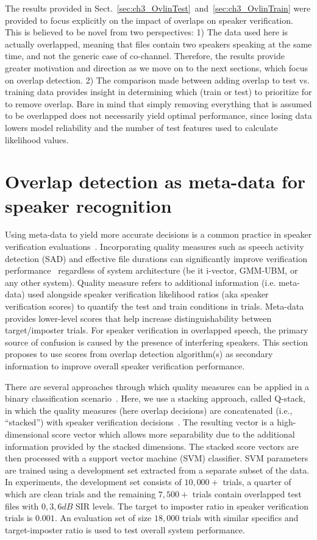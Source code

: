 The results provided in Sect.~\ref{sec:ch3_OvlinTest}~and~\ref{sec:ch3_OvlinTrain} were provided to focus explicitly on the impact of overlaps on speaker verification. 
This is believed to be novel from two perspectives: 
1) The data used here is actually overlapped, meaning that files contain two speakers speaking at the same time, and not the generic case of co-channel. Therefore, the results provide greater motivation and direction as we move on to the next sections, which focus on overlap detection. 
2) The comparison made between adding overlap to test vs. training data provides insight in determining which (train or test) to prioritize for to remove overlap. Bare in mind that simply removing everything that is assumed to be overlapped does not necessarily yield optimal performance, since losing data lowers model reliability and the number of test features used to calculate likelihood values. 


\section{Overlap detection as meta-data for speaker recognition}
\label{sec:ch2_OvlQualityMeasure} 
Using meta-data to yield more accurate decisions is a common practice in speaker verification evaluations~\cite{bosaris,qual_sid_13}. 
Incorporating quality measures such as speech activity detection (SAD) and effective file durations can significantly improve verification performance~\cite{qual_sid_13,CRSSSRE12} regardless of system architecture (be it i-vector, GMM-UBM, or any other system). 
Quality measure refers to additional information (i.e. meta-data) used alongside speaker verification likelihood ratios (aka speaker verification scores) to quantify the test and train conditions in trials. 
Meta-data provides lower-level scores that help increase distinguishability between target/imposter trials. 
For speaker verification in overlapped speech, the primary source of confusion is caused by the presence of interfering speakers. 
This section proposes to use scores from overlap detection algorithm(s) as secondary information to improve overall speaker verification performance. 

There are several approaches through which quality measures can be applied in a binary classification scenario~\cite{bosaris,ietqstack,kelly2013}. 
Here, we use a stacking approach, called Q-stack, in which the quality measures (here overlap decisions) are concatenated (i.e., ``stacked'') with speaker verification decisions~\cite{ietqstack}. 
The resulting vector is a high-dimensional score vector which allows more separability due to the additional information provided by the stacked dimensions. 
The stacked score vectors are then processed with a support vector machine (SVM) classifier. 
SVM parameters are trained using a development set extracted from a separate subset of the data. 
In experiments, the development set consists of $10,000+$ trials, a quarter of which are clean trials and the remaining $7,500+$ trials contain overlapped test files with $0,3,6dB$ SIR levels. 
The target to imposter ratio in speaker verification trials is $0.001$. 
An evaluation set of size $18,000$ trials with similar specifics and target-imposter ratio is used to test overall system performance.


